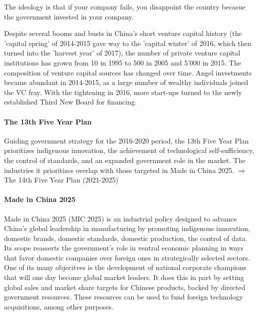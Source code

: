 \vspace{1\baselineskip}

The ideology is that if your company fails, you disappoint the country becasue
the government invested in your company.

\vspace{1\baselineskip}

Despite several booms and busts in China's short venture capital history
(the 'capital spring' of 2014-2015 gave way to the 'capital winter' of 2016,
which then turned into the 'harvest year' of 2017), the number of private
venture capital institutions has grown from 10 in 1995 to 500 in 2005 and
5'000 in 2015. The composition of venture capital sources has changed over time.
Angel investments became abundant in 2014-2015, as a large number of wealthy
individuals joined the VC fray. With the tightening in 2016, more start-ups
turned to the newly established Third New Board for financing.

\paragraph{The 13th Five Year Plan}

Guiding government strategy for the 2016-2020 period, the 13th Five Year Plan
prioritizes indigenous innovation, the achievement of technological self-sufficiency,
the control of standards, and an expanded government role in the market. The
industries it prioritizes overlap with those targeted in Made in China 2025.
$\Rightarrow$ The 14th Five Year Plan (2021-2025)

\paragraph{Made in China 2025}

Made in China 2025 (MIC 2025) is an industrial policy designed to advance
China's global leadership in manufacturing by promoting indigenous innovation,
domestic brands, domestic standards, domestic production, the control of data.
Its scope reasserts the government's role in ventral economic planning in ways
that favor domestic companies over foreign ones in strategically selected sectors.
One of its many objecitves is the development of national corporate champions
that will one day become global market leaders. It does this in part by setting
global sales and market share targets for Chinese products, backed by directed
government resources. These resources can be used to fund foreign technology
acquisitions, among other purposes.

